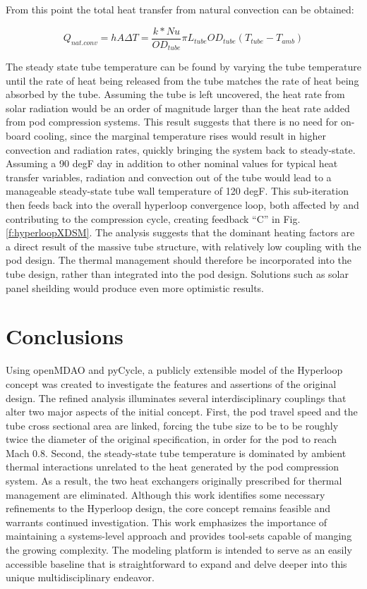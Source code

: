 \documentclass[heading.tex]{subfiles}
\begin{document}
From this point the total heat transfer from natural convection can be obtained:

\begin{equation}
Q_{nat. conv} = hA \Delta T = \frac{k*Nu}{ {OD}_{tube}} \pi {L}_{tube} {OD}_{tube} (T_{tube}-T_{amb})
\end{equation}

The steady state tube temperature can be found by varying the tube temperature until the
rate of heat being released from the tube matches the rate of heat being absorbed by the tube.
Assuming the tube is left uncovered, the heat rate from solar radiation would be an order of
magnitude larger than the heat rate added from pod compression systems.
This result suggests that there is no need for on-board cooling, since the marginal temperature
rises would result in higher convection and radiation rates, quickly bringing the system back to steady-state.
Assuming a 90 degF day in addition to other nominal values for typical heat transfer variables,
radiation and convection out of the tube would lead to a manageable steady-state tube wall temperature of 120 degF.
This sub-iteration then feeds back into the overall hyperloop convergence loop, both affected by
and contributing to the compression cycle, creating feedback “C” in Fig. \ref{f:hyperloopXDSM}.
The analysis suggests that the dominant heating factors are a direct result of the massive tube structure,
with relatively low coupling with the pod design.
The thermal management should therefore be incorporated into the tube design, rather than integrated into the pod design.
Solutions such as solar panel sheilding would produce even more optimistic results.


\section{Conclusions}

Using openMDAO and pyCycle, a publicly extensible model of the Hyperloop concept was created 
to investigate the features and assertions of the original design. 
The refined analysis illuminates several
interdisciplinary couplings that alter two major aspects of the initial concept.
First, the pod travel speed and the tube cross sectional area are linked, forcing 
the tube size to be to be roughly twice the diameter of the original specification, in order for the 
pod to reach Mach 0.8. Second, the steady-state tube temperature is dominated by ambient thermal interactions
unrelated to the heat generated by the pod compression system.
As a result, the two heat exchangers originally prescribed for thermal management are eliminated.
Although this work identifies some necessary refinements to the Hyperloop design, the core 
concept remains feasible and warrants continued investigation. 
This work emphasizes the importance of maintaining a systems-level approach
and provides tool-sets capable of manging the growing complexity.
The modeling platform is intended to serve as an easily accessible baseline that is straightforward to
expand and delve deeper into this unique multidisciplinary endeavor.
\end{document}
